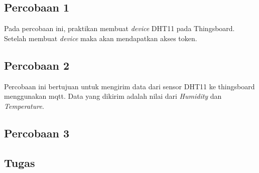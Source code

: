 \documentclass{class}
\begin{document}
  \subsection{Percobaan 1}
    Pada percobaan ini, praktikan membuat \emph{device} DHT11 pada Thingsboard.
    Setelah membuat \emph{device} maka akan mendapatkan akses token.
  \subsection{Percobaan 2}
    Percobaan ini bertujuan untuk mengirim data dari sensor DHT11 ke thingsboard menggunakan mqtt.
    Data yang dikirim adalah nilai dari \emph{Humidity} dan \emph{Temperature}.

  \subsection{Percobaan 3}
  \subsection{Tugas}
\end{document}
